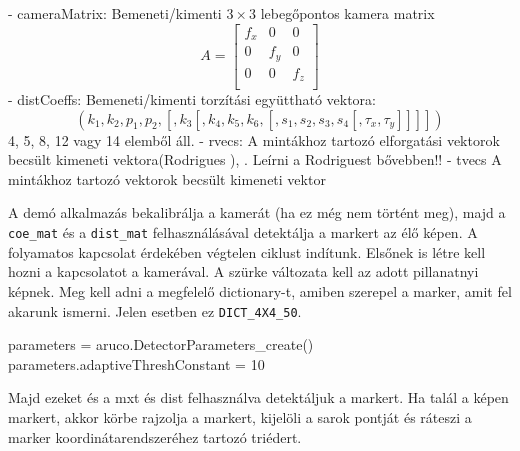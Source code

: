 - cameraMatrix: Bemeneti/kimenti $3 \times 3$ lebegőpontos kamera matrix
\[
A = 
\begin{bmatrix}
f_x & 0 & 0 \\
0 & f_y & 0 \\
0 & 0 & f_z \\
\end{bmatrix}
\]
- distCoeffs: Bemeneti/kimenti torzítási együttható vektora:
\[
(k_1, k_2, p_1, p_2, [, k_3 [, k_4, k_5, k_6, [, s_1, s_2, s_3, s_4 [, \tau_x, \tau_y]]]])
\]
4, 5, 8, 12 vagy 14 elemből áll.
- rvecs: A mintákhoz tartozó elforgatási vektorok becsült kimeneti vektora(Rodrigues ), . Leírni a Rodriguest bővebben!!
- tvecs	 A mintákhoz tartozó vektorok becsült kimeneti vektor




A demó alkalmazás bekalibrálja a kamerát (ha ez még nem történt meg), majd a \texttt{coe\_mat} és a \texttt{dist\_mat} felhasználásával detektálja a markert az élő képen.
A folyamatos kapcsolat érdekében végtelen ciklust indítunk. 
Elsőnek is létre kell hozni a kapcsolatot a kamerával. A szürke változata kell az adott pillanatnyi képnek. Meg kell adni a megfelelő dictionary-t, amiben szerepel a marker, amit fel akarunk ismerni. Jelen esetben ez \texttt{DICT\_4X4\_50}.
\begin{python}
parameters = aruco.DetectorParameters_create()
parameters.adaptiveThreshConstant = 10
\end{python}
Majd ezeket és a mxt és dist felhasználva detektáljuk a markert.
Ha talál a képen markert, akkor körbe rajzolja a markert, kijelöli a sarok pontját és ráteszi a marker koordinátarendszeréhez tartozó triédert.
